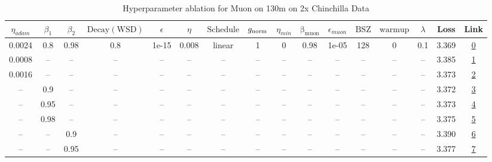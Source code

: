 \begin{table}[H]
\centering
\caption{Hyperparameter ablation for Muon on 130m on 2x Chinchilla Data}
\label{tab:ablation_muon_130m_on_2x_chinchilla_data}
\begin{tabular}{cccccccccccccccc}
\toprule
$\eta_{adam}$ & $\beta_1$ & $\beta_2$ & $\mathrm{Decay (WSD)}$ & $\epsilon$ & $\eta$ & $\mathrm{Schedule}$ & $g_{\mathrm{norm}}$ & $\eta_{min}$ & $\mathrm{\beta_{muon}}$ & $\epsilon_{muon}$ & $\mathrm{BSZ}$ & $\mathrm{warmup}$ & $\lambda$ & Loss & Link \\
\midrule
0.0024 & 0.8 & 0.98 & 0.8 & 1e-15 & 0.008 & linear & 1 & 0 & 0.98 & 1e-05 & 128 & 0 & 0.1 & 3.369 & \href{https://wandb.ai/marin-community/optimizer-scaling/runs/sweep-130m-5B-muon45194alr0.008-wd0.1-minlr0-warmup0-b10.8-b20.9-c1c97c}{0} \\
\midrule
0.0008 & -- & -- & -- & -- & -- & -- & -- & -- & -- & -- & -- & -- & -- & 3.385 & \href{https://wandb.ai/marin-community/optimizer-scaling/runs/sweep-130m-5B-muon3efb6clr0.008-wd0.1-minlr0-warmup0-b10.8-b20.9-a17a47}{1} \\
0.0016 & -- & -- & -- & -- & -- & -- & -- & -- & -- & -- & -- & -- & -- & 3.373 & \href{https://wandb.ai/marin-community/optimizer-scaling/runs/sweep-130m-5B-muoneae139lr0.008-wd0.1-minlr0-warmup0-b10.8-b20.9-c41ff5}{2} \\
-- & 0.9 & -- & -- & -- & -- & -- & -- & -- & -- & -- & -- & -- & -- & 3.372 & \href{https://wandb.ai/marin-community/optimizer-scaling/runs/sweep-130m-5B-muon055381lr0.008-wd0.1-minlr0-warmup0-b10.9-b20.9-ce41d0}{3} \\
-- & 0.95 & -- & -- & -- & -- & -- & -- & -- & -- & -- & -- & -- & -- & 3.373 & \href{https://wandb.ai/marin-community/optimizer-scaling/runs/sweep-130m-5B-muon1b4dealr0.008-wd0.1-minlr0-warmup0-b10.95-b20.-ce780d}{4} \\
-- & 0.98 & -- & -- & -- & -- & -- & -- & -- & -- & -- & -- & -- & -- & 3.375 & \href{https://wandb.ai/marin-community/optimizer-scaling/runs/sweep-130m-5B-muonc2fb90lr0.008-wd0.1-minlr0-warmup0-b10.98-b20.-b6c7cc}{5} \\
-- & -- & 0.9 & -- & -- & -- & -- & -- & -- & -- & -- & -- & -- & -- & 3.390 & \href{https://wandb.ai/marin-community/optimizer-scaling/runs/sweep-130m-5B-muoncb2d08lr0.008-wd0.1-minlr0-warmup0-b10.8-b20.9-2b200f}{6} \\
-- & -- & 0.95 & -- & -- & -- & -- & -- & -- & -- & -- & -- & -- & -- & 3.377 & \href{https://wandb.ai/marin-community/optimizer-scaling/runs/sweep-130m-5B-muon38610flr0.008-wd0.1-minlr0-warmup0-b10.8-b20.9-8ce9d3}{7} \\

\end{tabular}
\end{table}

